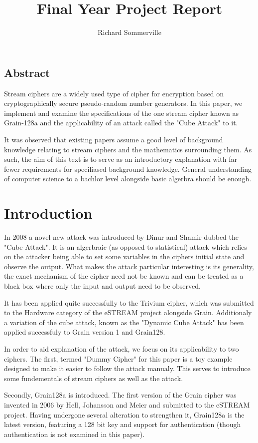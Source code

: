 \documentclass{report}
\title{Final Year Project Report}
\author{Richard Sommerville}
\date{}
\begin{document}
\maketitle
\tableofcontents
\section{Abstract}
Stream ciphers are a widely used type of cipher for encryption based on cryptographically secure pseudo-random number generators. In this paper, we  implement and examine the specifications of the one stream cipher known as Grain-128a and the applicability of an attack called the "Cube Attack" to it.

It was observed that existing papers assume a good level of background knowledge relating to stream ciphers and the mathematics surrounding them. As such, the aim of this text is to serve as an introductory explanation with far fewer requirements for speciliased background knowledge. General understanding of computer science to a bachlor level alongside basic algerbra should be enough.
\chapter{Introduction}
In 2008 a novel new attack was introduced by Dinur and Shamir\cite{DinurShamir2009} dubbed the "Cube Attack". It is an algerbraic (as opposed to statistical) attack which relies on the attacker being able to set some variables in the ciphers initial state and observe the output. What makes the attack particular interesting is its generality, the exact mechanism of the cipher need not be known and can be treated as a black box where only the input and output need to be observed.

It has been applied quite successfully to the Trivium cipher, which was submitted to the Hardware category of the eSTREAM project alongside Grain\cite{Grain128aSpec}. Additionaly a variation of the cube attack, known as the "Dynamic Cube Attack" has been applied successfuly to Grain version 1 and Grain128.

In order to aid explanation of the attack, we focus on its applicability to two ciphers. The first, termed "Dummy Cipher" for this paper is a toy example designed to make it easier to follow the attack manualy. This serves to introduce some fundementals of stream ciphers as well as the attack.

Secondly, Grain128a is introduced. The first version of the Grain cipher was invented in 2006 by Hell, Johansson and Meier \cite{Grain128aSpec} and submitted to the eSTREAM project. Having undergone several alteration to strengthen it, Grain128a is the latest version, featuring a 128 bit key and support for authentication (though authentication is not examined in this paper).
\end{document}
